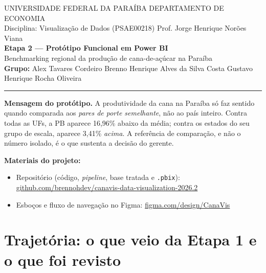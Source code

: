 \documentclass[11pt,a4paper]{article}
\begin{document}
\begin{center}
  {\small UNIVERSIDADE FEDERAL DA PARAÍBA \textbar{} DEPARTAMENTO DE ECONOMIA}\\[2pt]
  {\small Disciplina: Visualização de Dados (PSAE00218) \textbar{} Prof. Jorge Henrique Norões Viana}\\[10pt]
  {\large\bfseries\color{azulufpb} Etapa 2 — Protótipo Funcional em Power BI}\\[4pt]
  {\normalsize Benchmarking regional da produção de cana-de-açúcar na Paraíba}\\[10pt]
  {\small\textbf{Grupo:} Alex Tavares Cordeiro \textbar{} Brenno Henrique Alves da Silva Costa \textbar{} Gustavo Henrique Rocha Oliveira}
\end{center}

\vspace{0.4em}
\hrule
\vspace{1em}

\begin{caixadestaque}
\textbf{Mensagem do protótipo.} A produtividade da cana na Paraíba só faz sentido quando comparada
aos \textit{pares de porte semelhante}, não ao país inteiro. Contra todas as UFs, a PB aparece
16,96\% abaixo da média; contra os estados do seu grupo de escala, aparece 3,41\% \textit{acima}.
A referência de comparação, e não o número isolado, é o que sustenta a decisão do gerente.
\end{caixadestaque}

\vspace{0.6em}
\noindent\textbf{Materiais do projeto:}
\begin{itemize}
  \item Repositório (código, \textit{pipeline}, base tratada e \texttt{.pbix}):
  \href{https://github.com/brennohdev/canavis-data-visualization-2026.2}{github.com/brennohdev/canavis-data-visualization-2026.2}
  \item Esboços e fluxo de navegação no Figma:
  \href{https://www.figma.com/design/Q9GUVPPYaFZRSZYgWkuoGk/CanaVis?node-id=0-1&t=KTiA0CZoBhRHcCL0-1}{figma.com/design/CanaVis}
\end{itemize}

\section{Trajetória: o que veio da Etapa 1 e o que foi revisto}
\end{document}
